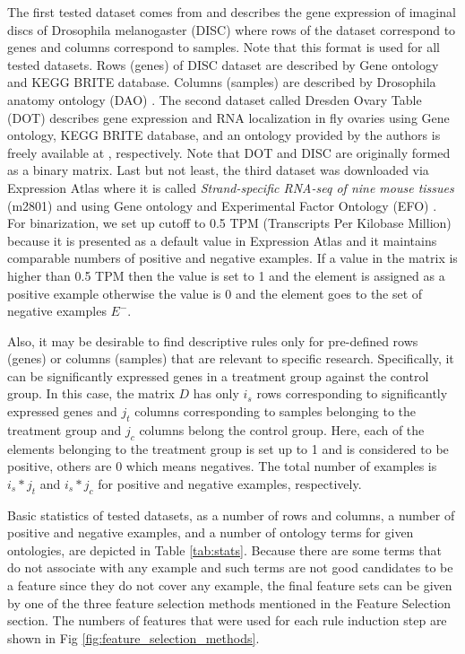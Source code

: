 \documentclass{bmcart}
\begin{document}
The first tested dataset comes from \cite{borovec2016binary} and describes the gene expression of imaginal discs of Drosophila melanogaster (DISC) where rows of the dataset correspond to genes and columns correspond to samples. Note that this format is used for all tested datasets. Rows (genes) of DISC dataset are described by Gene ontology \cite{ashburner2000gene,gene2016expansion} and KEGG BRITE database. Columns (samples) are described by Drosophila anatomy ontology (DAO) \cite{costa2013drosophila}. The second dataset called Dresden Ovary Table (DOT) \cite{jambor2015systematic,dot} describes gene expression and RNA localization in fly ovaries using Gene ontology, KEGG BRITE database, and an ontology provided by the authors is freely available at \cite{dot}, respectively. Note that DOT and DISC are originally formed as a binary matrix. Last but not least, the third dataset was downloaded via Expression Atlas \cite{petryszak2015expression} where it is called \emph{Strand-specific RNA-seq of nine mouse tissues}\cite{merkin2012evolutionary} (m2801) and using Gene ontology and Experimental Factor Ontology (EFO) \cite{malone2010modeling}. For binarization, we set up cutoff to 0.5 TPM (Transcripts Per Kilobase Million) because it is presented as a default value in Expression Atlas and it maintains comparable numbers of positive and negative examples. If a value in the matrix is higher than 0.5 TPM then the value is set to 1 and the element is assigned as a positive example otherwise the value is 0 and the element goes to the set of negative examples $E^{-}$.

Also, it may be desirable to find descriptive rules only for pre-defined rows (genes) or columns (samples) that are relevant to specific research. Specifically, it can be significantly expressed genes in a treatment group against the control group. In this case, the matrix $D$ has only $i_{s}$ rows corresponding to significantly expressed genes and $j_{t}$ columns corresponding to samples belonging to the treatment group and $j_{c}$ columns belong the control group. Here, each of the elements belonging to the treatment group is set up to 1 and is considered to be positive, others are 0 which means negatives. The total number of examples is $i_{s} * j_{t}$ and $i_{s} * j_{c}$ for positive and negative examples, respectively.




Basic statistics of tested datasets, as a number of rows and columns, a number of positive and negative examples, and a number of ontology terms for given ontologies, are depicted in Table \ref{tab:stats}. Because there are some terms that do not associate with any example and such terms are not good candidates to be a feature since they do not cover any example, the final feature sets can be given by one of the three feature selection methods mentioned in the Feature Selection section.
The numbers of features that were used for each rule induction step are shown in Fig \ref{fig:feature_selection_methods}.
\end{document}

